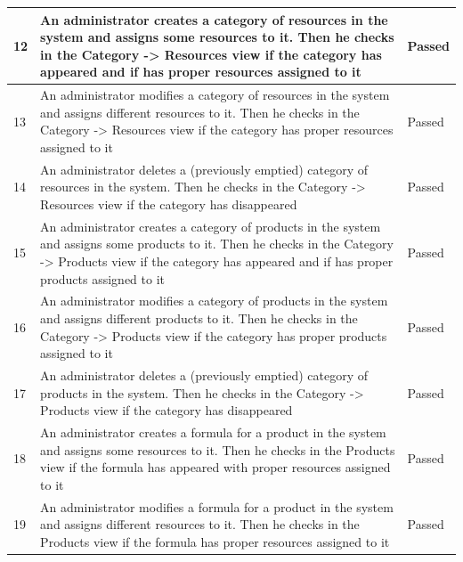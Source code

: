 \documentclass[a4paper,11pt,twoside]{report}
\theoremstyle{definition}
\begin{document}
\begin{longtable}{|p{1cm}|p{11cm}|p{4cm}|}
12 & An administrator creates a category of resources in the system and assigns some resources to it. Then he checks in the Category -> Resources view if the category has appeared and if has proper resources assigned to it & Passed \\ \hline
13 & An administrator modifies a category of resources in the system and assigns different resources to it. Then he checks in the Category -> Resources view if the category has proper resources assigned to it & Passed \\ \hline
14 & An administrator deletes a (previously emptied) category of resources in the system. Then he checks in the Category -> Resources view if the category has disappeared & Passed \\ \hline
15 & An administrator creates a category of products in the system and assigns some products to it. Then he checks in the Category -> Products view if the category has appeared and if has proper products assigned to it & Passed \\ \hline
16 & An administrator modifies a category of products in the system and assigns different products to it. Then he checks in the Category -> Products view if the category has proper products assigned to it & Passed \\ \hline
17 & An administrator deletes a (previously emptied) category of products in the system. Then he checks in the Category -> Products view if the category has disappeared & Passed \\ \hline


18 & An administrator creates a formula for a product in the system and assigns some resources to it. Then he checks in the Products view if the formula has appeared with proper resources assigned to it & Passed \\ \hline
19 & An administrator modifies a formula for a product in the system and assigns different resources to it. Then he checks in the Products view if the formula has proper resources assigned to it & Passed \\ \hline


\end{longtable}
\end{document}
